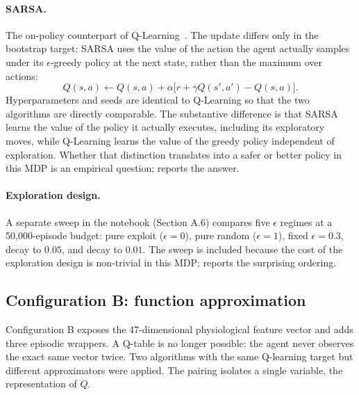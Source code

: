 \paragraph{SARSA.} The on-policy counterpart of Q-Learning~\citep{rummery1994sarsa,sutton2018reinforcement}. The update differs only in the bootstrap target: SARSA uses the value of the action the agent actually samples under its $\epsilon$-greedy policy at the next state, rather than the maximum over actions:
\begin{equation}
Q(s,a) \leftarrow Q(s,a) + \alpha \big[ r + \gamma Q(s', a') - Q(s,a) \big].
\end{equation}
Hyperparameters and seeds are identical to Q-Learning so that the two algorithms are directly comparable. The substantive difference is that SARSA learns the value of the policy it actually executes, including its exploratory moves, while Q-Learning learns the value of the greedy policy independent of exploration. Whether that distinction translates into a safer or better policy in this MDP is an empirical question;  reports the answer.

\paragraph{Exploration design.} A separate sweep in the notebook (Section A.6) compares five $\epsilon$ regimes at a 50{,}000-episode budget: pure exploit ($\epsilon = 0$), pure random ($\epsilon = 1$), fixed $\epsilon = 0.3$, decay to $0.05$, and decay to $0.01$. The sweep is included because the cost of the exploration design is non-trivial in this MDP;  reports the surprising ordering.

\subsection{Configuration B: function approximation}
\label{sec:methodology-B}

Configuration B exposes the 47-dimensional physiological feature vector and adds three episodic wrappers. A Q-table is no longer possible: the agent never observes the exact same vector twice. Two algorithms with the same Q-learning target but different approximators were applied. The pairing isolates a single variable, the representation of $Q$.

